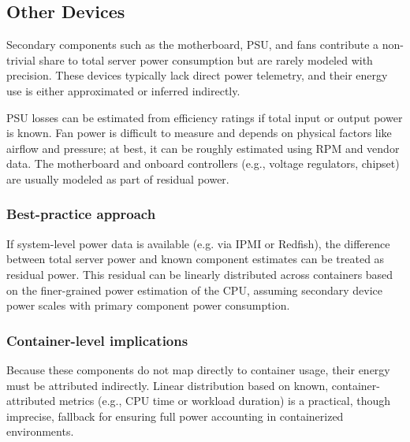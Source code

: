 \subsection{Other Devices}

Secondary components such as the motherboard, PSU, and fans contribute a non-trivial share to total server power consumption but are rarely modeled with precision. These devices typically lack direct power telemetry, and their energy use is either approximated or inferred indirectly.

PSU losses can be estimated from efficiency ratings if total input or output power is known. Fan power is difficult to measure and depends on physical factors like airflow and pressure; at best, it can be roughly estimated using RPM and vendor data. The motherboard and onboard controllers (e.g., voltage regulators, chipset) are usually modeled as part of residual power.

\subsubsection{Best-practice approach}
If system-level power data is available (e.g. via IPMI or Redfish), the difference between total server power and known component estimates can be treated as residual power. This residual can be linearly distributed across containers based on the finer-grained power estimation of the CPU, assuming secondary device power scales with primary component power consumption.

\subsubsection{Container-level implications}
Because these components do not map directly to container usage, their energy must be attributed indirectly. Linear distribution based on known, container-attributed metrics (e.g., CPU time or workload duration) is a practical, though imprecise, fallback for ensuring full power accounting in containerized environments.